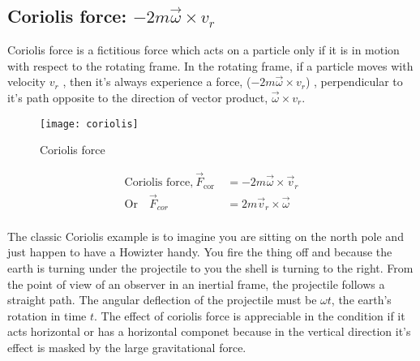 \subsection{Coriolis force: $-2 m \vec{\omega} \times {v_{r}}$}
Coriolis force is a fictitious force which acts on a particle only  if it is in motion with respect to the rotating frame. In the rotating frame, if a particle moves with velocity $v_{r}$ , then it's always experience a force, ($-2 m \vec{\omega} \times {v_{r}}$) , perpendicular to it's path opposite to the direction of vector product, $\vec{\omega} \times {v_{r}}$.
\begin{figure}[H]
	\centering
	\texttt{[image: coriolis]}
	\caption{Coriolis force}
	\label{Coriolis force}
\end{figure}
\begin{equation}
\begin{split}
\text{Coriolis force,}\ \vec{F}_{\text {cor }}&=-2 m \vec{\omega} \times \vec{v}_{r}\\  \text{Or}\quad \vec{F}_{c o r}&=2 m \vec{v}_{r} \times \vec{\omega}
\end{split}
\end{equation}\\ The classic Coriolis example is to imagine you are sitting on the north pole and just happen to have a Howizter handy. You fire the thing off and because the earth is turning under the projectile to you the shell is turning to the right. From the point of view of an observer in an inertial frame, the projectile follows a straight path. The angular deflection of the projectile must be $\omega t$, the earth's rotation in time $t$. The effect of coriolis force is appreciable in the condition if it acts horizontal or has a horizontal componet because in the vertical direction it's effect is masked by the large gravitational force.

